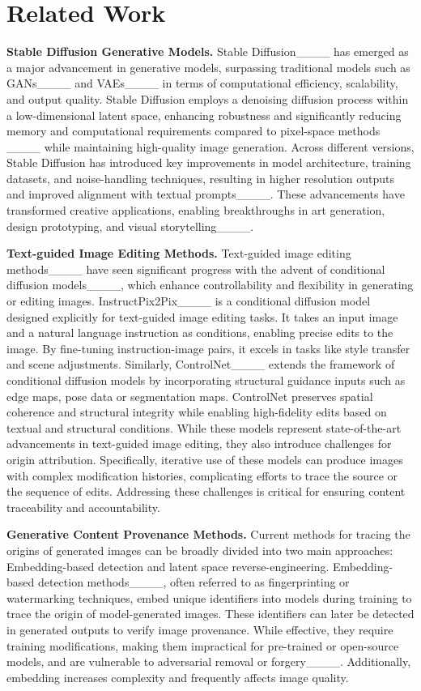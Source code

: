 \section{Related Work}
\label{sec:related}\vspace{-2pt} 
\textbf{Stable Diffusion Generative Models.} Stable Diffusion____ has emerged as a major advancement in generative models, surpassing traditional models such as GANs____ and VAEs____ in terms of computational efficiency, scalability, and output quality. Stable Diffusion employs a denoising diffusion process within a low-dimensional latent space, enhancing robustness and significantly reducing memory and computational requirements compared to pixel-space methods ____ while maintaining high-quality image generation. Across different versions, Stable Diffusion has introduced key improvements in model architecture, training datasets, and noise-handling techniques, resulting in higher resolution outputs and improved alignment with textual prompts____. These advancements have transformed creative applications, enabling breakthroughs in art generation, design prototyping, and visual storytelling____.

\textbf{Text-guided Image Editing Methods.} Text-guided image editing methods____ have seen significant progress with the advent of conditional diffusion models____, which enhance controllability and flexibility in generating or editing images. InstructPix2Pix____ is a conditional diffusion model designed explicitly for text-guided image editing tasks. It takes an input image and a natural language instruction as conditions, enabling precise edits to the image. By fine-tuning instruction-image pairs, it excels in tasks like style transfer and scene adjustments. Similarly, ControlNet____ extends the framework of conditional diffusion models by incorporating structural guidance inputs such as edge maps, pose data or segmentation maps. ControlNet preserves spatial coherence and structural integrity while enabling high-fidelity edits based on textual and structural conditions. While these models represent state-of-the-art advancements in text-guided image editing, they also introduce challenges for origin attribution. Specifically, iterative use of these models can produce images with complex modification histories, complicating efforts to trace the source or the sequence of edits. Addressing these challenges is critical for ensuring content traceability and accountability.

\textbf{Generative Content Provenance Methods.} Current methods for tracing the origins of generated images can be broadly divided into two main approaches:
Embedding-based detection and latent space reverse-engineering. Embedding-based detection methods____, often referred to as fingerprinting or watermarking techniques, embed unique identifiers into models during training to trace the origin of model-generated images. These identifiers can later be detected in generated outputs to verify image provenance. While effective, they require training modifications, making them impractical for pre-trained or open-source models, and are vulnerable to adversarial removal or forgery____. Additionally, embedding increases complexity and frequently affects image quality.

